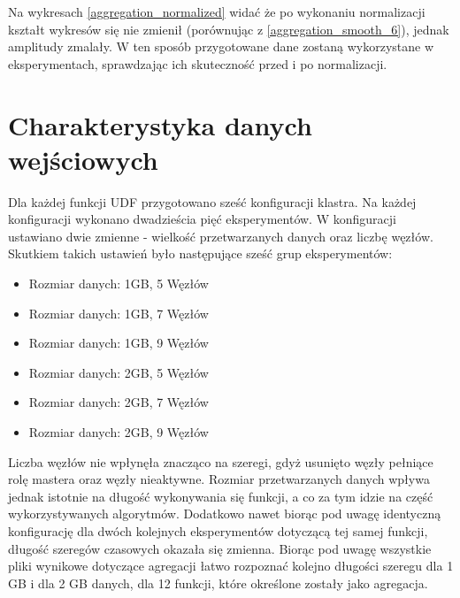 Na wykresach \ref{aggregation_normalized} widać że po wykonaniu normalizacji kształt wykresów się nie zmienił (porównując z \ref{aggregation_smooth_6}), jednak amplitudy zmalały. W ten sposób przygotowane dane zostaną wykorzystane w eksperymentach, sprawdzając ich skuteczność przed i po normalizacji.


\section{Charakterystyka danych wejściowych}

Dla każdej funkcji UDF przygotowano sześć konfiguracji klastra. Na każdej konfiguracji wykonano dwadzieścia pięć eksperymentów. W konfiguracji ustawiano dwie zmienne - wielkość przetwarzanych danych oraz liczbę węzłów. Skutkiem takich ustawień było następujące sześć grup eksperymentów: \begin{itemize}
    \item Rozmiar danych: 1GB, 5 Węzłów
    \item Rozmiar danych: 1GB, 7 Węzłów
    \item Rozmiar danych: 1GB, 9 Węzłów
    \item Rozmiar danych: 2GB, 5 Węzłów
    \item Rozmiar danych: 2GB, 7 Węzłów
    \item Rozmiar danych: 2GB, 9 Węzłów
\end{itemize}
Liczba węzłów nie wpłynęła znacząco na szeregi, gdyż usunięto węzły pełniące rolę mastera oraz węzły nieaktywne.
Rozmiar przetwarzanych danych wpływa jednak istotnie na długość wykonywania się funkcji, a co za tym idzie na część wykorzystywanych algorytmów.
Dodatkowo nawet biorąc pod uwagę identyczną konfigurację dla dwóch kolejnych eksperymentów dotyczącą tej samej funkcji, długość szeregów czasowych okazała się zmienna.
Biorąc pod uwagę wszystkie pliki wynikowe dotyczące agregacji łatwo rozpoznać kolejno długości szeregu dla 1 GB i dla 2 GB danych, dla 12 funkcji, które określone zostały jako agregacja.
